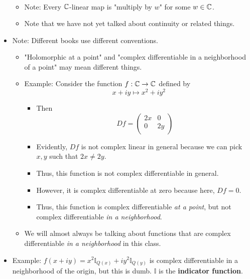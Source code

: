 \documentclass[../notes.tex]{subfiles}
\begin{document}
\begin{itemize}
\begin{itemize}
\begin{align*}
        \end{align*}
        \item Note: Every $\mathbb{C}$-linear map is "multiply by $w$" for some $w\in\mathbb{C}$.
        \item Note that we have not yet talked about continuity or related things.
    \end{itemize}
    \item Note: Different books use different conventions.
    \begin{itemize}
        \item "Holomorphic at a point" and "complex differentiable in a neighborhood of a point" may mean different things.
        \item Example: Consider the function $f:\mathbb{C}\to\mathbb{C}$ defined by
        \begin{equation*}
            x+iy \mapsto x^2+iy^2
        \end{equation*}
        \begin{itemize}
            \item Then
            \begin{equation*}
                Df =
                \begin{pmatrix}
                    2x & 0\\
                    0 & 2y\\
                \end{pmatrix}
            \end{equation*}
            \item Evidently, $Df$ is not complex linear in general because we can pick $x,y$ such that $2x\neq 2y$.
            \item Thus, this function is not complex differentiable in general.
            \item However, it is complex differentiable at zero because here, $Df=0$.
            \item Thus, this function is complex differentiable \emph{at a point}, but not complex differentiable \emph{in a neighborhood}.
        \end{itemize}
        \item We will almost always be talking about functions that are complex differentiable \emph{in a neighborhood} in this class.
    \end{itemize}
    \item Example: $f(x+iy)=x^2\mathbb{I}_{Q(x)}+iy^2\mathbb{I}_{Q(y)}$ is complex differentiable in a neighborhood of the origin, but this is dumb. $\mathbb{I}$ is the \textbf{indicator function}.

\end{itemize}
\end{document}
